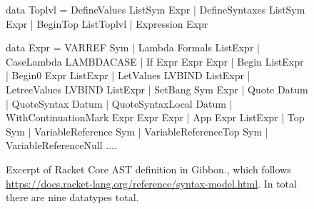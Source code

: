 \documentclass[a4paper,english]{lipics-v2016}
\begin{document}
{\begin{figure}[t]
  \begin{code}   
 data Toplvl = DefineValues   ListSym Expr 
             | DefineSyntaxes ListSym Expr 
             | BeginTop ListToplvl         
             | Expression Expr             
             
 data Expr = VARREF Sym                     
           | Lambda Formals ListExpr	     
           | CaseLambda LAMBDACASE          
           | If Expr Expr Expr              
           | Begin ListExpr
           | Begin0 Expr ListExpr           
           | LetValues    LVBIND ListExpr   
           | LetrecValues LVBIND ListExpr   
           | SetBang Sym Expr               
           | Quote Datum
           | QuoteSyntax Datum
           | QuoteSyntaxLocal Datum
           | WithContinuationMark Expr Expr Expr
           | App Expr ListExpr 
           | Top Sym
           | VariableReference    Sym 
           | VariableReferenceTop Sym 
           | VariableReferenceNull
    ....
  \end{code}




      







  \caption{Excerpt of Racket Core AST definition in Gibbon., which 
   follows \url{https://docs.racket-lang.org/reference/syntax-model.html}.
   In total there are nine datatypes total.}
  \label{fig:racket-core}
\end{figure}}
\end{document}
